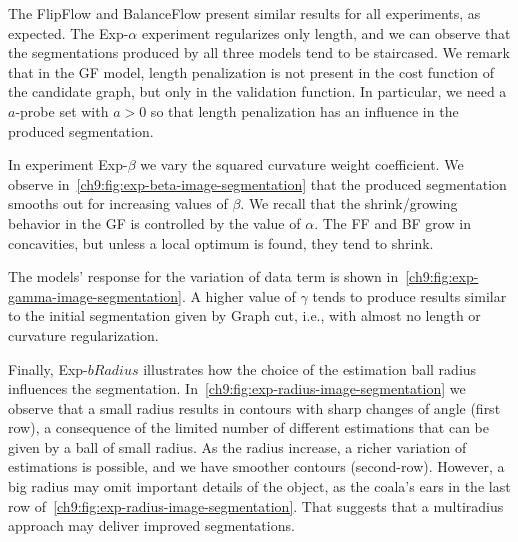 The FlipFlow and BalanceFlow present similar results for all experiments, as expected. The Exp-$\alpha$ experiment regularizes only length, and we can observe that the segmentations produced by all three models tend to be staircased. We remark that in the GF model, length penalization is not present in the cost function of the candidate graph, but only in the validation function. In particular, we need  a $a$-probe set with $a>0$ so that length penalization has an influence in the produced segmentation.

In experiment Exp-$\beta$ we vary the squared curvature weight coefficient. We observe in~\cref{ch9:fig:exp-beta-image-segmentation} that the produced segmentation smooths out for increasing values of $\beta$. We recall that the shrink/growing behavior in the GF is controlled by the value of $\alpha$. The FF and BF grow in concavities, but unless a local optimum is found, they tend to shrink.

The models' response for the variation of data term is shown in~\cref{ch9:fig:exp-gamma-image-segmentation}. A higher value of $\gamma$ tends to produce results similar to the initial segmentation given by Graph cut, i.e., with almost no length or curvature regularization.

Finally, Exp-$bRadius$ illustrates how the choice of the estimation ball radius influences the segmentation. In~\cref{ch9:fig:exp-radius-image-segmentation} we observe that a small radius results in contours with sharp changes of angle (first row), a consequence of the limited number of different estimations that can be given by a ball of small radius. As the radius increase, a richer variation of estimations is possible, and we have smoother contours (second-row). However, a big radius may omit important details of the object, as the coala's ears in the last row of~\cref{ch9:fig:exp-radius-image-segmentation}. That suggests that a multiradius approach may deliver improved segmentations.


